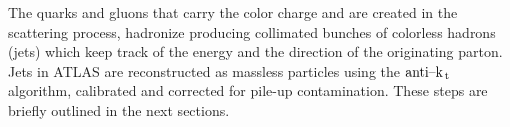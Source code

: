 The quarks and gluons that carry the color charge and are created in the
scattering process, hadronize producing collimated bunches of colorless hadrons
(jets) which keep track of the energy and the direction of the originating
parton. Jets in ATLAS are reconstructed as massless particles using the
\emph{$\text{anti--k}_\mathrm{\, t}$} algorithm, calibrated and corrected for pile-up
contamination. These steps are briefly outlined in the next sections.
